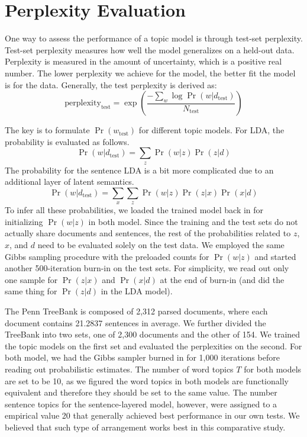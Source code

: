 \section{Perplexity Evaluation} \label{s:perplexity-evaluation}

One way to assess the performance of a topic model is through test-set
perplexity.  Test-set perplexity measures how well the model generalizes on
a held-out data.  Perplexity is measured in the amount of uncertainty, which is
a positive real number.  The lower perplexity we achieve for the model, the better
fit the model is for the data.  Generally, the test perplexity is derived as:
\[ \mathrm{perplexity_{test}} = \exp(\frac{- \sum_w \log \Pr(w|d_\mathrm{test})}{N_\mathrm{test}}) \]

The key is to formulate $\Pr(w_\mathrm{test})$ for different topic models.  For
LDA, the probability is evaluated as follows.  \[ \Pr(w|d_\mathrm{test}) =
\sum_z \Pr(w|z) \Pr(z|d) \] The probability for the sentence LDA is a
bit more complicated due to an additional layer of latent semantics.  \[
\Pr(w|d_\mathrm{test}) = \sum_x \sum_z \Pr(w|z) \Pr(z|x) \Pr(x|d) \]
To infer all these probabilities, we loaded the trained model back in for
initializing $\Pr(w|z)$ in both model.  Since the training and the test sets do
not actually share documents and sentences, the rest of the probabilities
related to $z$, $x$, and $d$ need to be evaluated solely on the test data.  We
employed the same Gibbs sampling procedure with the preloaded counts for
$\Pr(w|z)$ and started another 500-iteration burn-in on the test sets.  For
simplicity, we read out only one sample for $\Pr(z|x)$ and $\Pr(x|d)$ at the
end of burn-in (and did the same thing for $\Pr(z|d)$ in the LDA model).

The Penn TreeBank is composed of 2,312 parsed documents, where each document
contains 21.2837 sentences in average.  We further divided the TreeBank into
two sets, one of 2,300 documents and the other of 154.  We trained the topic
models on the first set and evaluated the perplexities on the second.  For both
model, we had the Gibbs sampler burned in for 1,000 iterations before reading
out probabilistic estimates.  The number of word topics $T$ for both models are
set to be 10, as we figured the word topics in both models are functionally
equivalent and therefore they should be set to the same value.  The number
sentence topics for the sentence-layered model, however, were assigned to a
empirical value 20 that generally achieved best performance in our own tests.
We believed that such type of arrangement works
best in this comparative study. 

